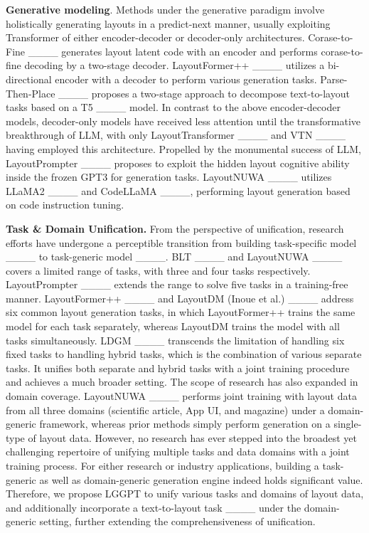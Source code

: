 \textbf{Generative modeling}. Methods under the generative paradigm involve holistically generating layouts in a predict-next manner, usually exploiting Transformer of either encoder-decoder or decoder-only architectures. Corase-to-Fine ____ generates layout latent code with an encoder and performs corase-to-fine decoding by a two-stage decoder. LayoutFormer++ ____ utilizes a bi-directional encoder with a decoder to perform various generation tasks. Parse-Then-Place ____ proposes a two-stage approach to decompose text-to-layout tasks based on a T5 ____ model. In contrast to the above encoder-decoder models, decoder-only models have received less attention until the transformative breakthrough of LLM, with only LayoutTransformer ____ and VTN ____ having employed this architecture. Propelled by the monumental success of LLM, LayoutPrompter ____ proposes to exploit the hidden layout cognitive ability inside the frozen GPT3 for generation tasks. LayoutNUWA ____ utilizes LLaMA2 ____ and CodeLLaMA ____, performing layout generation based on code instruction tuning.

\textbf{Task \& Domain Unification.} From the perspective of unification, research efforts have undergone a perceptible transition from building task-specific model ____ to task-generic model ____. BLT ____ and LayoutNUWA ____ covers a limited range of tasks, with three and four tasks respectively. LayoutPrompter ____ extends the range to solve five tasks in a training-free manner. LayoutFormer++ ____ and LayoutDM (Inoue et al.) ____ address six common layout generation tasks, in which LayoutFormer++ trains the same model for each task separately, whereas LayoutDM trains the model with all tasks simultaneously. LDGM ____ transcends the limitation of handling six fixed tasks to handling hybrid tasks, which is the combination of various separate tasks. It unifies both separate and hybrid tasks with a joint training procedure and achieves a much broader setting. The scope of research has also expanded in domain coverage. LayoutNUWA ____ performs joint training with layout data from all three domains (scientific article, App UI, and magazine) under a domain-generic framework, whereas prior methods simply perform generation on a single-type of layout data. However, no research has ever stepped into the broadest yet challenging repertoire of unifying multiple tasks and data domains with a joint training process. For either research or industry applications, building a task-generic as well as domain-generic generation engine indeed holds significant value. Therefore, we propose LGGPT to unify various tasks and domains of layout data, and additionally incorporate a text-to-layout task ____ under the domain-generic setting, further extending the comprehensiveness of unification.

